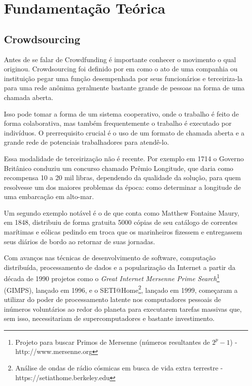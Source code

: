 \chapter{Fundamentação Teórica}

\section{Crowdsourcing}
Antes de se falar de Crowdfunding é importante conhecer o movimento o qual originou. Crowdsourcing foi definido por \citeauthor{wired-crowdsource} em \citeyear{wired-crowdsource} como o ato de uma companhia ou instituição pegar uma função desempenhada por seus funcionários e terceiriza-la para uma rede anônima geralmente bastante grande de pessoas na forma de uma chamada aberta.

Isso pode tomar a forma de um sistema cooperativo, onde o trabalho é feito de forma colaborativa, mas também frequentemente o trabalho é executado por indivíduos. O prerrequisito crucial é o uso de um formato de chamada aberta e a grande rede de potenciais trabalhadores para atendê-lo.

Essa modalidade de terceirização não é recente. Por exemplo em 1714 o Governo Britânico conduziu um concurso chamado Prêmio Longitude\cite{wiki-longitude_rewards}, que daria como recompensa 10 a 20 mil libras, dependendo da qualidade da solução, para quem resolvesse um dos maiores problemas da época: como determinar a longitude de uma embarcação em alto-mar.

Um segundo exemplo notável é o de \citeauthor{hearn2002tracks} que conta como Matthew Fontaine Maury, em 1848, distribuiu de forma gratuita 5000 cópias de seu catálogo de correntes marítimas e eólicas pedindo em troca que os marinheiros fizessem e entregassem seus diários de bordo ao retornar de suas jornadas.

Com avanços nas técnicas de desenvolvimento de software, computação distribuída, processamento de dados e a popularização da Internet a partir da década de 1990 projetos como o \emph{Great Internet Mersenne Prime Search}\footnote{Projeto para buscar Primos de Mersenne (números resultantes de \( 2^p - 1 \)) - http://www.mersenne.org} (GIMPS), lançado em 1996, e o SETI@Home\footnote{Análise de ondas de rádio cósmicas em busca de vida extra terrestre - https://setiathome.berkeley.edu}, lançado em 1999, começaram a utilizar do poder de processamento latente nos computadores pessoais de inúmeros voluntários ao redor do planeta para executarem tarefas massivas que, sem isso, necessitariam de supercomputadores e bastante investimento.


